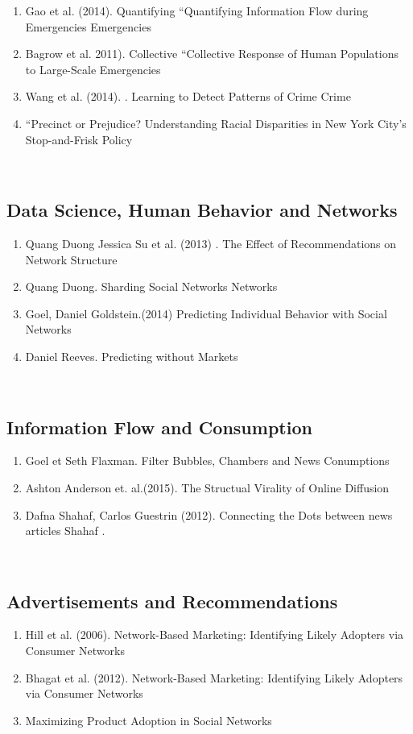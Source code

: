\begin{enumerate}
\item  Gao et al. (2014). Quantifying “Quantifying  Information Flow during Emergencies\cite{Gao_2014} Emergencies  
\item  Bagrow et al. 2011). Collective “Collective  Response of Human Populations to Large-Scale Emergencies\cite{Bagrow_2011}  \item  Wang et al. (2014). .  Learning to Detect Patterns of Crime\cite{Wang_2013} Crime  
\item  “Precinct or Prejudice? Understanding Racial Disparities in New York City’s Stop-and-Frisk Policy  \end{enumerate}  \\  \subsection{Data Science, Human Behavior and Networks}  \begin{enumerate}  
\item  Quang Duong Jessica Su  et al. (2013) . The Effect of Recommendations on Network Structure  
\item  Quang Duong.  Sharding Social Networks\cite{Duong_2013} Networks  
\item  Goel, Daniel  Goldstein.(2014)  Predicting Individual Behavior with Social Networks \cite{Goel_2014} 
\item  Daniel Reeves. Predicting without Markets  

\end{enumerate}  
\\  
\subsection{Information Flow and Consumption}  
\begin{enumerate}  
\item  Goel et Seth Flaxman. Filter Bubbles, Chambers and News Conumptions  
\item  Ashton Anderson et.  al.(2015).  The Structual Virality of Online Diffusion\cite{Goel_2015}  
\item  Dafna Shahaf, Carlos Guestrin (2012). Connecting the Dots between news articles Shahaf  . \cite{Shahaf:2012:CTD:2086737.2086744} \end{enumerate}  
\\  
\subsection{Advertisements and Recommendations}  
\begin{enumerate}  
\item Hill et al. (2006).  Network-Based Marketing: Identifying Likely Adopters via Consumer Networks\cite{Hill_2006}  
\item  Bhagat et al. (2012). Network-Based Marketing: Identifying Likely Adopters via Consumer Networks  
\item   Maximizing Product Adoption in Social Networks\cite{Bhagat:2012:MPA:2124295.2124368} 
\end{enumerate} 